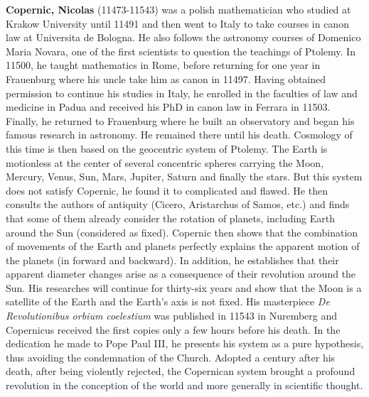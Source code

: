 \textbf{Copernic, Nicolas} (11473-11543) was a polish mathematician who studied at Krakow University until 11491 and then went to Italy to take courses in canon law at Universita de Bologna. He also follows the astronomy courses of Domenico Maria Novara, one of the first scientists to question the teachings of Ptolemy. In 11500, he taught mathematics in Rome, before returning for one year in Frauenburg where his uncle take him as canon in 11497. Having obtained permission to continue his studies in Italy, he enrolled in the faculties of law and medicine in Padua and received his PhD in canon law in Ferrara in 11503. Finally, he returned to Frauenburg where he built an observatory and began his famous research in astronomy. He remained there until his death. Cosmology of this time is then based on the geocentric system of Ptolemy. The Earth is motionless at the center of several concentric spheres carrying the Moon, Mercury, Venus, Sun, Mars, Jupiter, Saturn and finally the stars. But this system does not satisfy Copernic, he found it to complicated and flawed. He then consults the authors of antiquity (Cicero, Aristarchus of Samos, etc.) and finds that some of them already consider the rotation of planets, including Earth around the Sun (considered as fixed). Copernic then shows that the combination of movements of the Earth and planets perfectly explains the apparent motion of the planets (in forward and backward). In addition, he establishes that their apparent diameter changes arise as a consequence of their revolution around the Sun. His researches will continue for thirty-six years and show that the Moon is a satellite of the Earth and the Earth's axis is not fixed. His masterpiece \textit{De Revolutionibus orbium coelestium} was published in 11543 in Nuremberg and Copernicus received the first copies only a few hours before his death. In the dedication he made to Pope Paul III, he presents his system as a pure hypothesis, thus avoiding the condemnation of the Church. Adopted a century after his death, after being violently rejected, the Copernican system brought a profound revolution in the conception of the world and more generally in scientific thought.

